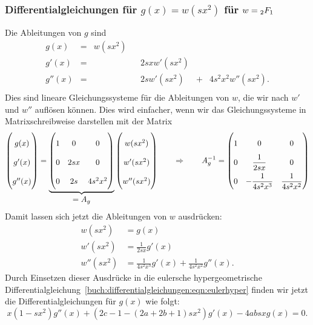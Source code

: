 \subsubsection{Differentialgleichungen für $g(x)=w(sx^2)$ für $w=\mathstrut_2F_1$}
Die Ableitungen von $g$ sind
\[
\renewcommand\arraycolsep{2pt}
\begin{array}{rcrcrcr}
  g(x)&=&w(sx^2)& &           & &                 \\
 g'(x)&=&       & &2sxw'(sx^2)& &                 \\
g''(x)&=&       & & 2sw'(sx^2)&+&4s^2x^2w''(sx^2).\\
\end{array}
\]
Dies sind lineare Gleichungssysteme für die Ableitungen
von $w$, die wir nach $w'$ und $w''$ auflösen können.
Dies wird einfacher, wenn wir das Gleichungssysteme in
Matrixschreibweise darstellen mit der Matrix
\begin{equation*}
\begin{pmatrix}
  g(x)\\
 g'(x)\\
g''(x)
\end{pmatrix}
=
\underbrace{
\begin{pmatrix}
1&   0&       0\\
0& 2sx&       0\\
0&  2s& 4s^2x^2
\end{pmatrix}
}_{\displaystyle = A_g}
\begin{pmatrix}
w(sx^2)\\
w'(sx^2)\\
w''(sx^2)
\end{pmatrix}
\qquad\Rightarrow\qquad
A_g^{-1}
=
\renewcommand{\arraystretch}{2.0}
\begin{pmatrix}
1&            0       &               0  \\
0&\displaystyle  \frac{1}{2sx}     &               0  \\
0&\displaystyle -\frac{1}{4s^2x^3} &\displaystyle \frac{1}{4s^2x^2}
\end{pmatrix}
\end{equation*}
Damit lassen sich jetzt die Ableitungen von $w$ ausdrücken:
\begin{align*}
  w(sx^2) &= g(x) \\
 w'(sx^2) &= \frac{1}{2sx} g'(x) \\
w''(sx^2) &= \frac{1}{4s^2x^3}g'(x) + \frac{1}{4s^2x^2} g''(x).
\end{align*}
Durch Einsetzen dieser Ausdrücke in die eulersche hypergeometrische
Differentialgleichung~\eqref{buch:differentialgleichungen:eqn:eulerhyper}
finden wir jetzt die Differentialgleichungen für $g(x)$ 
wie folgt:
\begin{equation}
x(1-sx^2)g''(x)
+
(2c-1-(2a+2b+1)sx^2) g'(x)
-4absx g(x)
=
0.
\label{buch:differential:hypergeometrisch:geradedgl}
\end{equation}


